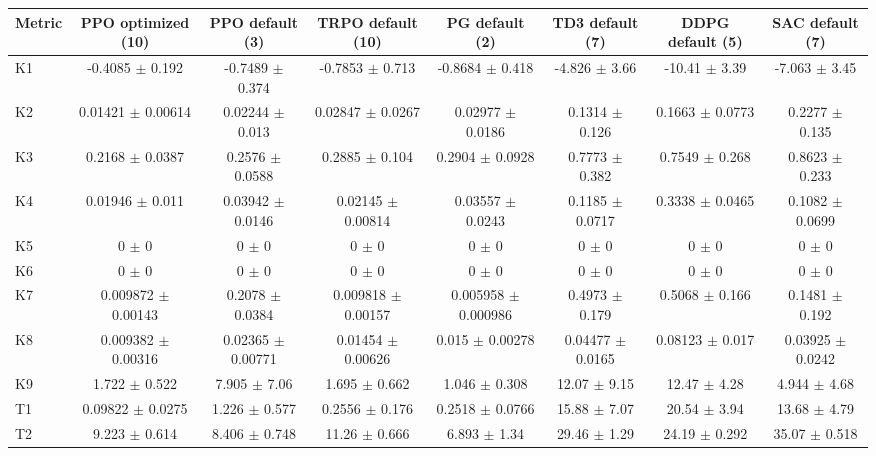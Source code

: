 \begin{tabular}{lccccccc}
\toprule
Metric & PPO optimized (10) & PPO default (3) & TRPO default (10) & PG default (2) & TD3 default (7) & DDPG default (5) & SAC default (7) \\
\midrule
K1 & -0.4085 $\pm$ 0.192 & -0.7489 $\pm$ 0.374 & -0.7853 $\pm$ 0.713 & -0.8684 $\pm$ 0.418 & -4.826 $\pm$ 3.66 & -10.41 $\pm$ 3.39 & -7.063 $\pm$ 3.45 \\
K2 & 0.01421 $\pm$ 0.00614 & 0.02244 $\pm$ 0.013 & 0.02847 $\pm$ 0.0267 & 0.02977 $\pm$ 0.0186 & 0.1314 $\pm$ 0.126 & 0.1663 $\pm$ 0.0773 & 0.2277 $\pm$ 0.135 \\
K3 & 0.2168 $\pm$ 0.0387 & 0.2576 $\pm$ 0.0588 & 0.2885 $\pm$ 0.104 & 0.2904 $\pm$ 0.0928 & 0.7773 $\pm$ 0.382 & 0.7549 $\pm$ 0.268 & 0.8623 $\pm$ 0.233 \\
K4 & 0.01946 $\pm$ 0.011 & 0.03942 $\pm$ 0.0146 & 0.02145 $\pm$ 0.00814 & 0.03557 $\pm$ 0.0243 & 0.1185 $\pm$ 0.0717 & 0.3338 $\pm$ 0.0465 & 0.1082 $\pm$ 0.0699 \\
K5 & 0 $\pm$ 0 & 0 $\pm$ 0 & 0 $\pm$ 0 & 0 $\pm$ 0 & 0 $\pm$ 0 & 0 $\pm$ 0 & 0 $\pm$ 0 \\
K6 & 0 $\pm$ 0 & 0 $\pm$ 0 & 0 $\pm$ 0 & 0 $\pm$ 0 & 0 $\pm$ 0 & 0 $\pm$ 0 & 0 $\pm$ 0 \\
K7 & 0.009872 $\pm$ 0.00143 & 0.2078 $\pm$ 0.0384 & 0.009818 $\pm$ 0.00157 & 0.005958 $\pm$ 0.000986 & 0.4973 $\pm$ 0.179 & 0.5068 $\pm$ 0.166 & 0.1481 $\pm$ 0.192 \\
K8 & 0.009382 $\pm$ 0.00316 & 0.02365 $\pm$ 0.00771 & 0.01454 $\pm$ 0.00626 & 0.015 $\pm$ 0.00278 & 0.04477 $\pm$ 0.0165 & 0.08123 $\pm$ 0.017 & 0.03925 $\pm$ 0.0242 \\
K9 & 1.722 $\pm$ 0.522 & 7.905 $\pm$ 7.06 & 1.695 $\pm$ 0.662 & 1.046 $\pm$ 0.308 & 12.07 $\pm$ 9.15 & 12.47 $\pm$ 4.28 & 4.944 $\pm$ 4.68 \\
T1 & 0.09822 $\pm$ 0.0275 & 1.226 $\pm$ 0.577 & 0.2556 $\pm$ 0.176 & 0.2518 $\pm$ 0.0766 & 15.88 $\pm$ 7.07 & 20.54 $\pm$ 3.94 & 13.68 $\pm$ 4.79 \\
T2 & 9.223 $\pm$ 0.614 & 8.406 $\pm$ 0.748 & 11.26 $\pm$ 0.666 & 6.893 $\pm$ 1.34 & 29.46 $\pm$ 1.29 & 24.19 $\pm$ 0.292 & 35.07 $\pm$ 0.518 \\
\bottomrule
\end{tabular}

